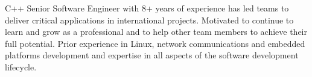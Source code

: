 

\begin{cvparagraph}

C++ Senior Software Engineer with 8+ years of experience has led teams to deliver critical applications in international projects. Motivated to continue to learn and grow as a professional and to help other team members to achieve their full potential. Prior experience in Linux, network communications and embedded platforms development and expertise in all aspects of the software development lifecycle.
\end{cvparagraph}


